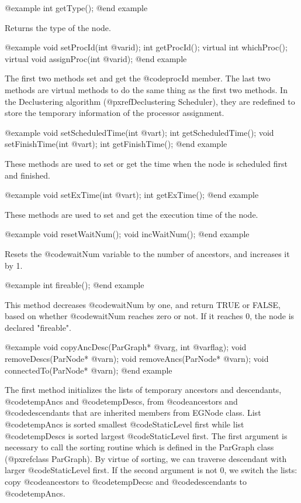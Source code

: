 @example
int getType();
@end example

Returns the type of the node.

@example
void setProcId(int @var{id});
int getProcId();
virtual int whichProc();
virtual void assignProc(int @var{id});
@end example

The first two methods set and get the @code{procId} member. The last
two methods are virtual methods to do the same thing as the first two
methods. In the Declustering algorithm (@pxref{Declustering Scheduler}),
they are redefined to store the temporary information of the processor
assignment.

@example
void setScheduledTime(int @var{t});
int getScheduledTime();
void setFinishTime(int @var{t});
int getFinishTime();
@end example

These methods are used to set or get the time when the node is
scheduled first and finished.

@example
void setExTime(int @var{t});
int getExTime();
@end example

These methods are used to set and get the execution time of the node.

@example
void resetWaitNum();
void incWaitNum();
@end example

Resets the @code{waitNum} variable to the number of ancestors, and
increases it by 1.

@example
int fireable();
@end example

This method decreases @code{waitNum} by one, and return TRUE or FALSE,
based on whether @code{waitNum} reaches zero or not. If it reaches 0,
the node is declared "fireable".

@example
void copyAncDesc(ParGraph* @var{g}, int @var{flag});
void removeDescs(ParNode* @var{n});
void removeAncs(ParNode* @var{n});
void connectedTo(ParNode* @var{n});
@end example

The first method initializes the lists of temporary ancestors and
descendants, @code{tempAncs} and @code{tempDescs}, from 
@code{ancestors} and @code{descendants} that are inherited members from
EGNode class. List @code{tempAncs} is sorted smallest @code{StaticLevel}
first while list @code{tempDescs} is sorted largest @code{StaticLevel}
first. The first argument is necessary to call the sorting routine which
is defined in the ParGraph class (@pxref{class ParGraph}). By virtue of
sorting, we can traverse descendant with larger @code{StaticLevel} first.
If the second argument is not 0, we switch the lists: copy 
@code{ancestors} to @code{tempDecsc} and @code{descendants} to
@code{tempAncs}.

